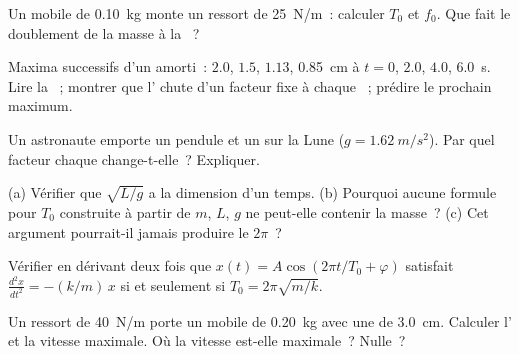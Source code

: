 \begin{exercise}[$\star$]\label{exo:g12:oscillators-and-time:3}
Un mobile de \qty{0.10}{kg} monte un ressort de \qty{25}{N/m}~:
calculer $T_0$ et $f_0$. Que fait le doublement de la masse à la
~?
\end{exercise}

\begin{exercise}[$\star$]\label{exo:g12:oscillators-and-time:4}
Maxima successifs d'un 
amorti~: $2.0$, $1.5$, $1.13$, \qty{0.85}{cm} à
$t = 0$, $2.0$, $4.0$, \qty{6.0}{s}. Lire la
~; montrer que l'
chute d'un facteur fixe à chaque ~; prédire le
prochain maximum.
\end{exercise}

\begin{exercise}[$\star$]\label{exo:g12:oscillators-and-time:5}
Un astronaute emporte un pendule et un
 sur la Lune
($g = \qty{1.62}{m/s^2}$). Par quel facteur chaque
 change-t-elle~? Expliquer.
\end{exercise}

\begin{exercise}[$\star\star$]\label{exo:g12:oscillators-and-time:6}
(a) Vérifier que $\sqrt{L/g}$ a la dimension d'un temps. (b) Pourquoi
aucune formule pour $T_0$ construite à partir de $m$, $L$, $g$ ne
peut-elle contenir la masse~? (c) Cet argument pourrait-il jamais
produire le $2\pi$~?
\end{exercise}

\begin{exercise}[$\star\star$]\label{exo:g12:oscillators-and-time:7}
Vérifier en dérivant deux fois que $x(t) = A\cos(2\pi t/T_0 +
\varphi)$ satisfait $\frac{d^2x}{dt^2} = -(k/m)\,x$ si et seulement
si $T_0 = 2\pi\sqrt{m/k}$.
\end{exercise}

\begin{exercise}[$\star\star$]\label{exo:g12:oscillators-and-time:8}
Un ressort de  \qty{40}{N/m} porte un mobile de
\qty{0.20}{kg} avec une  de \qty{3.0}{cm}.
Calculer l' et la vitesse maximale. Où la
vitesse est-elle maximale~? Nulle~?
\end{exercise}

